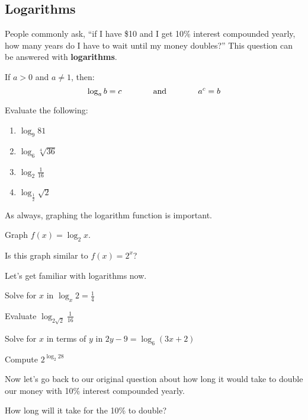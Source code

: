 	\subsection{Logarithms}
	People commonly ask, ``if I have \$10 and I get 10\% interest compounded yearly, how many years do I have to wait until my money doubles?'' This question can be answered with \textbf{logarithms}. \par
	\begin{definition} If $a > 0$ and $a \neq 1$, then: 
  $$\log_a b = c \text{\hspace{35pt}  and \hspace{35pt}} a^{c} = b$$
	\end{definition}
	\begin{problem} Evaluate the following: \end{problem}
		\begin{multicols}{2}
			\begin{enumerate}
				\item $\log_9 81$
				\item $\log_6 \sqrt[4]{36}$
				\item $\log_2 \frac{1}{16}$
				\item $\log_\frac{1}{2} \sqrt{2}$
			\end{enumerate}
		\end{multicols}
	
	As always, graphing the logarithm function is important.
	
	\begin{problem} Graph $f(x) = \log_2 x$. \end{problem} \vspace{1.3in}
	
	Is this graph similar to $f(x) = 2^{x}$? \vspace{1in}
	
	Let's get familiar with logarithms now. \vspace{1in}
	
	\begin{problem} Solve for $x$ in $\log_x 2 = \frac{1}{4}$ \end{problem} \vspace{1in}	
	\begin{problem} Evaluate $\log_{2\sqrt{2}} \frac{1}{16}$ \end{problem} \vspace{1in}
	\begin{problem} Solve for $x$ in terms of $y$ in $2y-9 = \log_6 (3x+2)$ \end{problem} \vspace{1in}
	\begin{problem} Compute $2^{\log_2 28}$ \end{problem} \vspace{1in}
	Now let's go back to our original question about how long it would take to double our money with 10\% interest compounded yearly. \par
	\begin{problem} How long will it take for the 10\% to double? \end{problem} \vspace{.7in}
	
